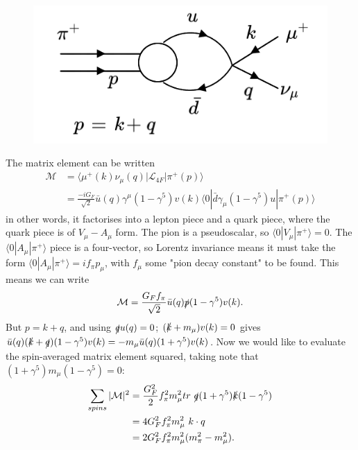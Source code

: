 \documentclass[a4paper,12pt]{article}
\begin{document}
\begin{figure}
  \centering
  \includegraphics[width=\linewidth]{figs/diag_2.png}
\end{figure}
The matrix element can be written 
\begin{equation}
\begin{split}
    \mathcal{M} &= \langle \mu^+(k) \nu_\mu(q) | \mathcal{L}_{4F} | \pi^+(p) \rangle \\
    &= \frac{-iG_F}{\sqrt{2}} \bar{u}(q)\gamma^\mu(1-\gamma^5)v(k) \langle 0 | \bar{d}\gamma_\mu(1-\gamma^5)u | \pi^+(p) \rangle
\end{split}
\end{equation}
in other words, it factorises into a lepton piece and a quark piece, where the quark piece is of $V_\mu - A_\mu$ form. The pion is a pseudoscalar, so $\langle 0 | V_\mu | \pi^+ \rangle = 0$. The $\langle 0 | A_\mu | \pi^+ \rangle$ piece is a four-vector, so Lorentz invariance means it must take the form $\langle 0 | A_\mu | \pi^+ \rangle = i f_\pi p_\mu$, with $f_\mu$ some "pion decay constant" to be found. This means we can write
\begin{equation}
    \mathcal{M} = \frac{G_F f_\pi}{\sqrt{2}}\bar{u}(q)\slashed{p}(1-\gamma^5)v(k).
\end{equation}
But $p = k + q$, and using $\slashed{q}u(q)=0$; $(\slashed{k} + m_\mu)v(k)=0$ gives $\bar{u}(q)(\slashed{k} + \slashed{q})(1-\gamma^5)v(k) = -m_\mu \bar{u}(q)(1+ \gamma^5) v(k)$. Now we would like to evaluate the spin-averaged matrix element squared, taking note that $(1+\gamma^5)m_\mu(1-\gamma^5)=0$:
\begin{equation}
\begin{split}
\sum_{spins}|\mathcal{M}|^2 &= \frac{G_F^2}{2} f_\pi^2 m_\mu^2 tr\ \slashed{q}(1+\gamma^5) \slashed{k} (1-\gamma^5) \\
&= 4G_F^2 f_\pi^2 m_\mu^2\ k \cdot q \\
&= 2G_F^2 f_\pi^2 m_\mu^2(m_\pi^2 - m_\mu^2).
\end{split}
\end{equation}
\end{document}
